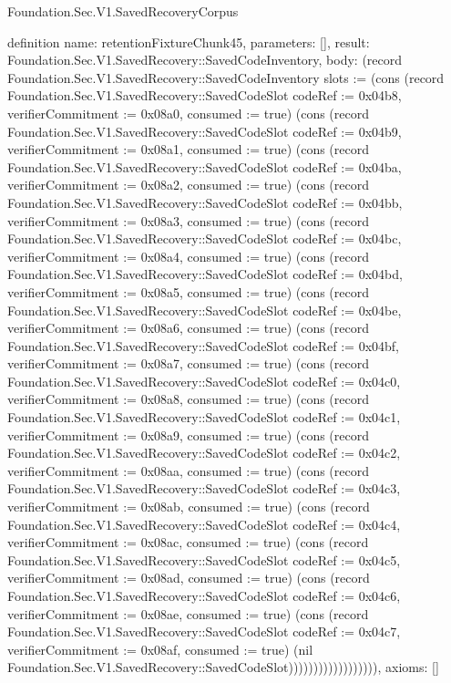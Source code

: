 \begin{lexlean}{Foundation.Sec.V1.SavedRecoveryCorpus}
\begin{semanticmodule}
definition{
  name: retentionFixtureChunk45,
  parameters: [],
  result: Foundation.Sec.V1.SavedRecovery::SavedCodeInventory,
  body: (record Foundation.Sec.V1.SavedRecovery::SavedCodeInventory {slots := (cons (record Foundation.Sec.V1.SavedRecovery::SavedCodeSlot {codeRef := 0x04b8, verifierCommitment := 0x08a0, consumed := true}) (cons (record Foundation.Sec.V1.SavedRecovery::SavedCodeSlot {codeRef := 0x04b9, verifierCommitment := 0x08a1, consumed := true}) (cons (record Foundation.Sec.V1.SavedRecovery::SavedCodeSlot {codeRef := 0x04ba, verifierCommitment := 0x08a2, consumed := true}) (cons (record Foundation.Sec.V1.SavedRecovery::SavedCodeSlot {codeRef := 0x04bb, verifierCommitment := 0x08a3, consumed := true}) (cons (record Foundation.Sec.V1.SavedRecovery::SavedCodeSlot {codeRef := 0x04bc, verifierCommitment := 0x08a4, consumed := true}) (cons (record Foundation.Sec.V1.SavedRecovery::SavedCodeSlot {codeRef := 0x04bd, verifierCommitment := 0x08a5, consumed := true}) (cons (record Foundation.Sec.V1.SavedRecovery::SavedCodeSlot {codeRef := 0x04be, verifierCommitment := 0x08a6, consumed := true}) (cons (record Foundation.Sec.V1.SavedRecovery::SavedCodeSlot {codeRef := 0x04bf, verifierCommitment := 0x08a7, consumed := true}) (cons (record Foundation.Sec.V1.SavedRecovery::SavedCodeSlot {codeRef := 0x04c0, verifierCommitment := 0x08a8, consumed := true}) (cons (record Foundation.Sec.V1.SavedRecovery::SavedCodeSlot {codeRef := 0x04c1, verifierCommitment := 0x08a9, consumed := true}) (cons (record Foundation.Sec.V1.SavedRecovery::SavedCodeSlot {codeRef := 0x04c2, verifierCommitment := 0x08aa, consumed := true}) (cons (record Foundation.Sec.V1.SavedRecovery::SavedCodeSlot {codeRef := 0x04c3, verifierCommitment := 0x08ab, consumed := true}) (cons (record Foundation.Sec.V1.SavedRecovery::SavedCodeSlot {codeRef := 0x04c4, verifierCommitment := 0x08ac, consumed := true}) (cons (record Foundation.Sec.V1.SavedRecovery::SavedCodeSlot {codeRef := 0x04c5, verifierCommitment := 0x08ad, consumed := true}) (cons (record Foundation.Sec.V1.SavedRecovery::SavedCodeSlot {codeRef := 0x04c6, verifierCommitment := 0x08ae, consumed := true}) (cons (record Foundation.Sec.V1.SavedRecovery::SavedCodeSlot {codeRef := 0x04c7, verifierCommitment := 0x08af, consumed := true}) (nil Foundation.Sec.V1.SavedRecovery::SavedCodeSlot)))))))))))))))))}),
  axioms: []
}


\end{semanticmodule}
\end{lexlean}
